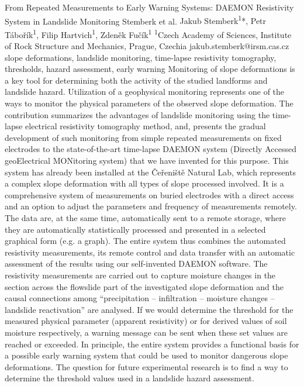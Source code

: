 \abstract
{From Repeated Measurements to Early Warning Systems: DAEMON Resistivity System in Landslide Monitoring
} 
{Stemberk et al.} 
{Jakub Stemberk\textsuperscript{1}*, Petr Tábořík\textsuperscript{1}, Filip Hartvich\textsuperscript{1}, Zdeněk Fučík\textsuperscript{1}} 
{\POtag} 
{
\textsuperscript{1}Czech Academy of Sciences, Institute of Rock Structure and Mechanics, Prague, Czechia
}
{jakub.stemberk@irsm.cas.cz}  %
{slope deformations, landslide monitoring, time-lapse resistivity tomography, thresholds, hazard assessment, early warning}
{Monitoring of slope deformations is a key tool for determining both the activity of the studied landforms and landslide hazard. Utilization of a geophysical monitoring represents one of the ways to monitor the physical parameters of the observed slope deformation. The contribution summarizes the advantages of landslide monitoring using the time-lapse electrical resistivity tomography method, and, presents the gradual development of such monitoring from simple repeated measurements on fixed electrodes to the state-of-the-art time-lapse DAEMON system (Directly Accessed geoElectrical MONitoring system) that we have invented for this purpose. This system has already been installed at the Čeřeniště Natural Lab, which represents a complex slope deformation with all types of slope processed involved. It is a comprehensive system of measurements on buried electrodes with a direct access and an option to adjust the parameters and frequency of measurements remotely. The data are, at the same time, automatically sent to a remote storage, where they are automatically statistically processed and presented in a selected graphical form (e.g. a graph). The entire system thus combines the automated resistivity measurements, its remote control and data transfer with an automatic assessment of the results using our self-invented DAEMON software. The resistivity measurements are carried out to capture moisture changes in the section across the flowslide part of the investigated slope deformation and the causal connections among \enquote{precipitation – infiltration – moisture changes – landslide reactivation} are analysed. If we would determine the threshold for the measured physical parameter (apparent resistivity) or for derived values of soil moisture respectively, a warning message can be sent when these set values are reached or exceeded. In principle, the entire system provides a functional basis for a possible early warning system that could be used to monitor dangerous slope deformations. The question for future experimental research is to find a way to determine the threshold values used in a landslide hazard assessment.
}
